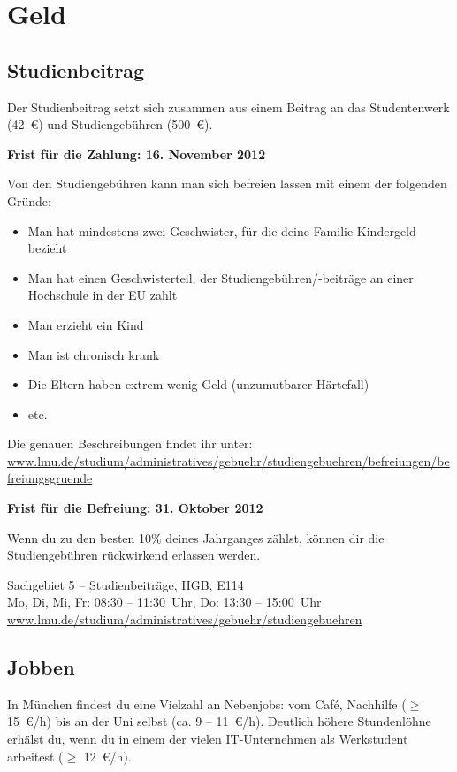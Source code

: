 ﻿
\section{Geld}

\subsection{Studienbeitrag}
Der Studienbeitrag setzt sich zusammen aus einem Beitrag an das Studentenwerk (42~€) und Studiengebühren (500~€).

\textbf{Frist für die Zahlung: 16. November 2012}

Von den Studiengebühren kann man sich befreien lassen mit einem der
folgenden Gründe:
\begin{itemize}
        \item Man hat mindestens zwei Geschwister, für die deine Familie
          Kindergeld bezieht
	\item Man hat einen Geschwisterteil, der Studiengebühren/-beiträge an einer Hochschule in der EU zahlt
	\item Man erzieht ein Kind
	\item Man ist chronisch krank
	\item Die Eltern haben extrem wenig Geld (unzumutbarer Härtefall)
	\item etc.
\end{itemize}

Die genauen Beschreibungen findet ihr unter: \url{www.lmu.de/studium/administratives/gebuehr/studiengebuehren/befreiungen/befreiungsgruende}

\textbf{Frist für die Befreiung: 31. Oktober 2012}

Wenn du zu den besten 10\% deines Jahrganges zählst, können dir die
Studiengebühren rückwirkend erlassen werden.

Sachgebiet 5 -- Studienbeiträge, HGB, E114\\
Mo, Di, Mi, Fr: 08:30 -- 11:30~Uhr, Do: 13:30 -- 15:00~Uhr\\
\url{www.lmu.de/studium/administratives/gebuehr/studiengebuehren}


\subsection{Jobben}
In München findest du eine Vielzahl an Nebenjobs: vom Café, Nachhilfe ($\geq$ 15~€/h) bis an der Uni selbst (ca. 9 -- 11~€/h). Deutlich höhere Stundenlöhne erhälst du, wenn du in einem der vielen IT-Unternehmen als Werkstudent arbeitest ($\geq$ 12~€/h).

